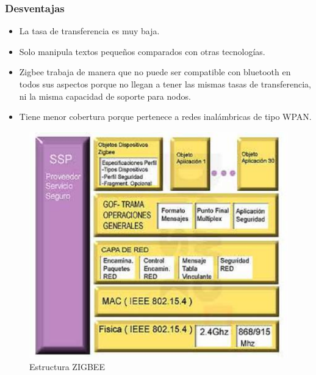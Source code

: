 \subsubsection{Desventajas}
\begin{itemize}
\item La tasa de transferencia es muy baja.
\item Solo manipula textos pequeños comparados con otras tecnologías.
\item Zigbee trabaja de manera que no puede ser compatible con bluetooth en todos sus aspectos porque no llegan a tener las mismas tasas de transferencia, ni la misma capacidad de soporte para nodos.
\item  Tiene menor cobertura porque pertenece a redes inalámbricas de tipo WPAN\cite{12}.
\end{itemize}
\begin{figure}[h]
    \centering
    \includegraphics[width=1\textwidth]{ima/z1_phpBkhYj6}
    \caption{Estructura ZIGBEE \cite{12}}
    \label{fig:mesh15}
\end{figure}